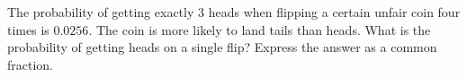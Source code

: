 The probability of getting exactly $3$ heads when flipping a certain unfair coin four times is $0.0256$. The coin is more likely to land tails than heads. What is the probability of getting heads on a single flip? Express the answer as a common fraction.
